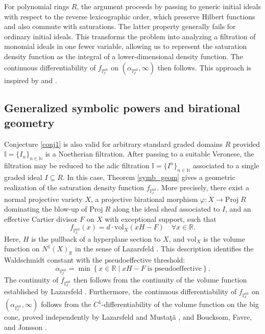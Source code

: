 \documentclass[12pt,a4paper]{amsart}
\theoremstyle{plain}
\theoremstyle{definition}
\numberwithin{equation}{theorem}
\begin{document}
For polynomial rings $R$, the argument proceeds by passing to generic initial ideals with respect to the reverse lexicographic order, which preserve Hilbert functions and also commute with saturations. The latter property generally fails for ordinary initial ideals. This transforms the problem into analyzing a filtration of monomial ideals in one fewer variable, allowing us to represent the saturation density function as the integral of a lower-dimensional density function. The continuous differentiability of $f_{\mathbb{I}^{\mathrm{sat}}_J}$ on $(\alpha_{\mathbb{I}^{\mathrm{sat}}_J},\infty)$ then follows. This approach is inspired by \cite{May14} and \cite{DST15}.

\subsection*{Generalized symbolic powers and birational geometry} Conjecture \ref{conj1} is also valid for arbitrary standard graded domains $R$ provided $\mathbb{I}=\{I_n\}_{n\in\mathbb{N}}$ is a Noetherian filtration. After passing to a suitable Veronese, the filtration may be reduced to the adic filtration $\mathbb{I}=\{I^n\}_{n\in\mathbb{N}}$ associated to a single graded ideal $I\subseteq R$. In this case, Theorem \ref{symb_geom} gives a geometric realization of the saturation density function $f_{\mathbb{I}^{\mathrm{sat}}_J}$. More precisely, there exist a normal projective variety $X$, a projective birational morphism $\varphi \colon X \to \mathrm{Proj}\;R$ dominating the blow-up of $\mathrm{Proj}\;R$ along the ideal sheaf associated to $I$, and an effective Cartier divisor $F$ on $X$ with exceptional support, such that $$f_{\mathbb{I}^{\mathrm{sat}}_J}(x) = d\cdot \mathrm{vol}_X(xH-F)\quad \forall x\in \mathbb{R}.$$ Here, $H$ is the pullback of a hyperplane section to $X$, and $\mathrm{vol}_X$ is the volume function on $N^1(X)_{\mathbb{R}}$ in the sense of Lazarsfeld \cite{Laz04a}. This description identifies the Waldschmidt constant with the pseudoeffective threshold: $$\alpha_{\mathbb{I}^{\mathrm{sat}}_J} = \min\left\{x\in \mathbb{R} \mid xH-F\;\text{is pseudoeffective}\right\}.$$ The continuity of $f_{\mathbb{I}^{\mathrm{sat}}_J}$ then follows from the continuity of the volume function established by Lazarsfeld \cite{Laz04a}. Furthermore, the continuous differentiability of $f_{\mathbb{I}^{\mathrm{sat}}_J}$ on $(\alpha_{\mathbb{I}^{\mathrm{sat}}_J},\infty)$ follows from the $C^1$-differentiability of the volume function on the big cone, proved independently by Lazarsfeld and Musta\c{t}\u{a} \cite{LM09}, and Boucksom, Favre, and Jonsson \cite{BFJ09}.
\end{document}
